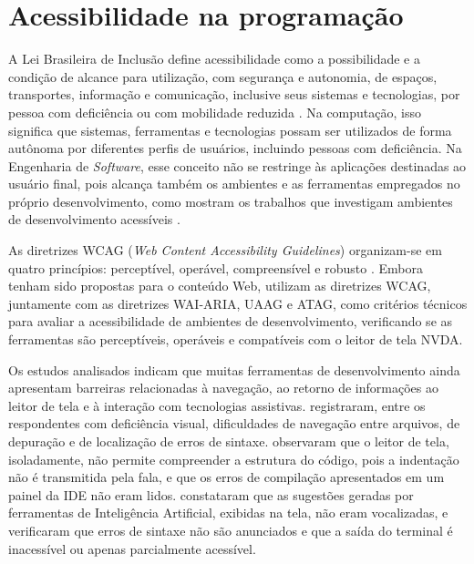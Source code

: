 \documentclass[
    12pt,                   %
    openright,              %
    oneside,                %
    a4paper,                %
    sumario=tradicional,    %
    english,                %
    brazil,                 %
    ]{abntex2}
\begin{document}
\section{Acessibilidade na programação}\label{sec:AcessComputacao}

A Lei Brasileira de Inclusão define acessibilidade como a possibilidade e a condição de alcance para utilização, com segurança e autonomia, de espaços, transportes, informação e comunicação, inclusive seus sistemas e tecnologias, por pessoa com deficiência ou com mobilidade reduzida \cite{brasil2015lbi}. Na computação, isso significa que sistemas, ferramentas e tecnologias possam ser utilizados de forma autônoma por diferentes perfis de usuários, incluindo pessoas com deficiência. Na Engenharia de \textit{Software}, esse conceito não se restringe às aplicações destinadas ao usuário final, pois alcança também os ambientes e as ferramentas empregados no próprio desenvolvimento, como mostram os trabalhos que investigam ambientes de desenvolvimento acessíveis \cite{latinoware37693,latinoware6969}.

As diretrizes WCAG (\textit{Web Content Accessibility Guidelines}) organizam-se em quatro princípios: perceptível, operável, compreensível e robusto \cite{w3c2024wcag22}. Embora tenham sido propostas para o conteúdo Web, \textcite{latinoware6969} utilizam as diretrizes WCAG, juntamente com as diretrizes WAI-ARIA, UAAG e ATAG, como critérios técnicos para avaliar a acessibilidade de ambientes de desenvolvimento, verificando se as ferramentas são perceptíveis, operáveis e compatíveis com o leitor de tela NVDA.

Os estudos analisados indicam que muitas ferramentas de desenvolvimento ainda apresentam barreiras relacionadas à navegação, ao retorno de informações ao leitor de tela e à interação com tecnologias assistivas. \textcite{latinoware20457} registraram, entre os respondentes com deficiência visual, dificuldades de navegação entre arquivos, de depuração e de localização de erros de sintaxe. \textcite{acad54431201} observaram que o leitor de tela, isoladamente, não permite compreender a estrutura do código, pois a indentação não é transmitida pela fala, e que os erros de compilação apresentados em um painel da IDE não eram lidos. \textcite{latinoware34224} constataram que as sugestões geradas por ferramentas de Inteligência Artificial, exibidas na tela, não eram vocalizadas, e \textcite{latinoware6969} verificaram que erros de sintaxe não são anunciados e que a saída do terminal é inacessível ou apenas parcialmente acessível.
\end{document}
